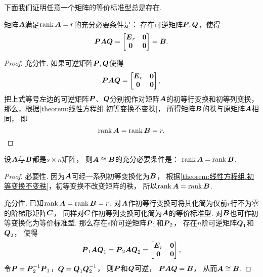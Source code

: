 下面我们证明任意一个矩阵的等价标准型总是存在.
\begin{theorem}\label{theorem:矩阵乘积的秩.等价标准型的存在性}
矩阵\(\boldsymbol{A}\)满足\(\rank\boldsymbol{A}=r\)的充分必要条件是：
存在可逆矩阵\(\boldsymbol{P},\boldsymbol{Q}\)，使得\begin{equation*}
	\boldsymbol{P} \boldsymbol{A} \boldsymbol{Q}
	= \begin{bmatrix}
		\boldsymbol{E}_r & \boldsymbol0 \\
		\boldsymbol0 & \boldsymbol0
	\end{bmatrix} = \boldsymbol{B}.
\end{equation*}
\begin{proof}
充分性.
如果可逆矩阵\(\boldsymbol{P},\boldsymbol{Q}\)使得\begin{equation*}
	\boldsymbol{P}\boldsymbol{A}\boldsymbol{Q}
	= \begin{bmatrix}
		\boldsymbol{E}_r & \boldsymbol0 \\
		\boldsymbol0 & \boldsymbol0
	\end{bmatrix},
\end{equation*}
把上式等号左边的可逆矩阵\(\boldsymbol{P}\)、\(\boldsymbol{Q}\)分别视作对矩阵\(\boldsymbol{A}\)的初等行变换和初等列变换，
那么，根据\cref{theorem:线性方程组.初等变换不变秩}，
所得矩阵\(\boldsymbol{B}\)的秩与原矩阵\(\boldsymbol{A}\)相同，
即\begin{equation*}
	\rank\boldsymbol{A} = \rank\boldsymbol{B} = r.
	\qedhere
\end{equation*}
\end{proof}
\end{theorem}

\begin{theorem}\label{theorem:矩阵乘积的秩.矩阵等价的充分必要条件}
设\(\boldsymbol{A}\)与\(\boldsymbol{B}\)都是\(s \times n\)矩阵，
则\(\boldsymbol{A} \cong \boldsymbol{B}\)的充分必要条件是：
\(\rank\boldsymbol{A} = \rank\boldsymbol{B}\).
\begin{proof}
必要性.
因为\(\boldsymbol{A}\)可经一系列初等变换化为\(\boldsymbol{B}\)，
根据\cref{theorem:线性方程组.初等变换不变秩}，初等变换不改变矩阵的秩，
所以\(\rank\boldsymbol{A} = \rank\boldsymbol{B}\).

充分性.
已知\(\rank\boldsymbol{A} = \rank\boldsymbol{B} = r\).
对\(\boldsymbol{A}\)作初等行变换可将其化简为仅前\(r\)行不为零的阶梯形矩阵\(\boldsymbol{C}\)，
同样对\(\boldsymbol{C}\)作初等列变换可化简为\(\boldsymbol{A}\)的等价标准型.
对\(\boldsymbol{B}\)也可作初等变换化为等价标准型.
那么存在\(s\)阶可逆矩阵\(\boldsymbol{P}_1\)和\(\boldsymbol{P}_2\)，
存在\(n\)阶可逆矩阵\(\boldsymbol{Q}_1\)和\(\boldsymbol{Q}_2\)，
使得\begin{equation*}
	\boldsymbol{P}_1 \boldsymbol{A} \boldsymbol{Q}_1 = \boldsymbol{P}_2 \boldsymbol{A} \boldsymbol{Q}_2
	= \begin{bmatrix} \boldsymbol{E}_r & \boldsymbol0 \\ \boldsymbol0 & \boldsymbol0 \end{bmatrix},
\end{equation*}
令\(\boldsymbol{P} = \boldsymbol{P}_2^{-1} \boldsymbol{P}_1\)，\(\boldsymbol{Q} = \boldsymbol{Q}_1 \boldsymbol{Q}_2^{-1}\)，
则\(\boldsymbol{P}\)和\(\boldsymbol{Q}\)可逆，
\(\boldsymbol{P} \boldsymbol{A} \boldsymbol{Q} = \boldsymbol{B}\)，
从而\(\boldsymbol{A} \cong \boldsymbol{B}\).
\end{proof}
\end{theorem}

